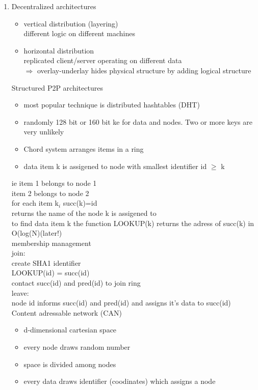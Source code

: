 \documentclass[ngerman,a4paper]{report}
\begin{document}
\begin{enumerate}
\item Decentralized architectures\\
\begin{itemize}
\item vertical distribution (layering)\\
different logic on different machines
\item horizontal distribution \\
replicated client/server operating on different data\\
$\Rightarrow$ overlay-underlay hides physical structure by adding logical structure\\
\end{itemize}

Structured P2P architectures\\
\begin{itemize}
\item most popular technique is distributed hashtables (DHT)\\
\item randomly 128 bit or 160 bit ke for data and nodes. Two or more keys are very unlikely\\
\item Chord system arranges items in a ring 
\item data item k is assigened to node with smallest identifier id $\geq$ k
\end{itemize}
ie item 1 belongs to node 1\\
item 2 belongs to node 2\\
for each item k$_i$ succ(k)=id\\
returns  the name of the node k is assigened to\\
to find data item k the function LOOKUP(k) returns the adress of succ(k) in O(log(N)(later!)\\

membership management\\
join:\\
create SHA1 identifier\\
LOOKUP(id) = succ(id)\\
contact succ(id) and pred(id) to join ring\\

leave:\\
node id informs succ(id) and pred(id) and assigns it's data to succ(id)\\

Content adressable network (CAN)\\
\begin{itemize}
\item d-dimensional cartesian space
\item every node draws random number
\item space is divided among nodes
\item every data draws identifier (coodinates) which assigns a node


\end{itemize}
\end{enumerate}
\end{document}
